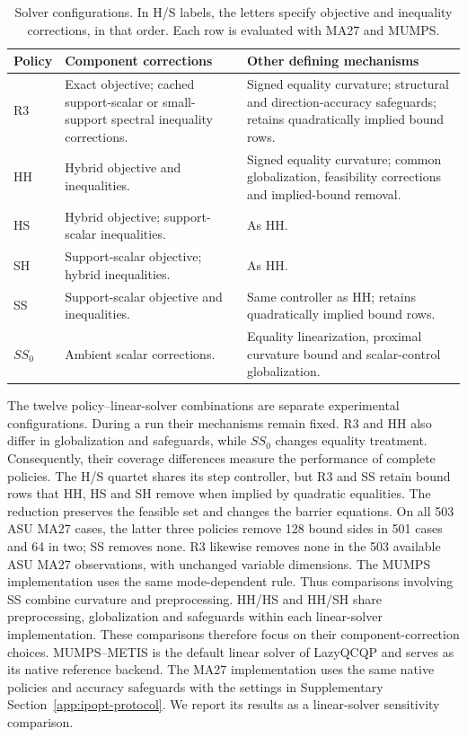 \documentclass[pdflatex,sn-mathphys-num]{sn-jnl}
\theoremstyle{thmstyleone}
\theoremstyle{thmstylethree}
\begin{document}
\begin{table}[t]
\centering\small
\caption{Solver configurations. In H/S labels, the letters specify objective and
inequality corrections, in that order. Each row is evaluated with MA27 and
MUMPS.}
\label{tab:variant-definitions}
\begin{tabularx}{\linewidth}{@{}l>{\raggedright\arraybackslash}X>{\raggedright\arraybackslash}X@{}}
\toprule
Policy & Component corrections & Other defining mechanisms\\
\midrule
R3 & Exact objective; cached support-scalar or small-support spectral
inequality corrections. & Signed equality curvature; structural and
direction-accuracy safeguards; retains quadratically implied bound rows.\\
HH & Hybrid objective and inequalities. & Signed equality curvature;
common globalization, feasibility corrections and implied-bound removal.\\
HS & Hybrid objective; support-scalar inequalities. & As HH.\\
SH & Support-scalar objective; hybrid inequalities. & As HH.\\
SS & Support-scalar objective and inequalities. & Same controller as HH;
retains quadratically implied bound rows.\\
$SS_0$ & Ambient scalar corrections. & Equality linearization, proximal
curvature bound and scalar-control globalization.\\
\bottomrule
\end{tabularx}
\end{table}

The twelve policy--linear-solver combinations are separate experimental
configurations. During a run their mechanisms remain fixed.
R3 and HH also differ in globalization and safeguards, while $SS_0$ changes
equality treatment. Consequently, their coverage differences measure the
performance of complete policies. The H/S quartet shares its step
controller, but R3 and SS retain bound rows that HH, HS and SH remove
when implied by quadratic equalities. The reduction preserves the feasible set and
changes the barrier equations. On all 503 ASU MA27 cases, the latter
three policies remove 128 bound sides in 501 cases and 64 in two; SS
removes none. R3 likewise removes none in the 503 available ASU MA27
observations, with unchanged variable dimensions. The MUMPS implementation uses the same mode-dependent rule.
Thus comparisons involving SS combine curvature and preprocessing.
HH/HS and HH/SH share preprocessing, globalization and safeguards within
each linear-solver implementation. These comparisons therefore focus on
their component-correction choices.
MUMPS--METIS is the default linear solver of LazyQCQP and serves as its
native reference backend. The MA27 implementation uses the same native
policies and accuracy safeguards
with the settings in Supplementary
Section~\ref{app:ipopt-protocol}. We report its results as a linear-solver
sensitivity comparison.
\end{document}
